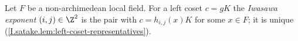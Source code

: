 Let $F$ be a non-archimedean local field. For a left coset $c=gK$ the \emph{Iwasawa exponent} $(i,j)\in\Z^2$ is the pair with $c=h_{i,j}(x)K$ for some $x\in F$; it is unique (\cref{I.satake.lem:left-coset-representatives}).
